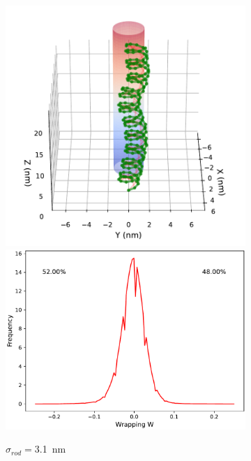 \documentclass[a4paper,10pt]{article}
\begin{document}
\begin{figure}[htbp]
\begin{subfigure}{.3\textwidth}
\includegraphics[width=\textwidth]{r1_B_2000000_17.pdf}
\includegraphics[width=\textwidth]{r1_B_wr_pr.pdf}
\caption{$\sigma_{rod}=$\SI{3.1}{\nm}}
\label{fig:r1_b}
\end{subfigure}
\begin{subfigure}{.3\textwidth}

\end{subfigure}
\end{figure}
\end{document}

